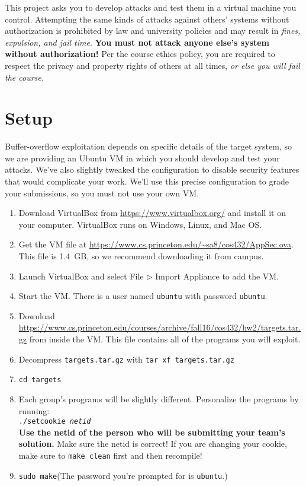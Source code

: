 \documentclass[letterpaper,12pt]{report}
\begin{document}
{This project asks you to develop attacks and test them in a virtual machine you
control.  Attempting the same kinds of attacks against others' systems without
authorization is prohibited by law and university policies and may result in
\emph{fines, expulsion, and jail time}.   \textbf{You must not attack anyone
else's system without authorization!}  Per the course ethics policy, you are
required to respect the privacy and  property rights of others at all times,
\emph{or else you will fail the course.}  

\section*{Setup}

Buffer-overflow exploitation depends on specific details of the target system,
so we are providing an Ubuntu VM in which you should develop and test your
attacks.  We've also slightly tweaked the configuration to disable security
features that would complicate your work.  We'll use this precise configuration
to grade your submissions, so you must not use your own VM.

\begin{enumerate}
\item Download VirtualBox from \url{https://www.virtualbox.org/} and install it on your computer.  VirtualBox runs on Windows, Linux, and Mac OS.
\item Get the VM file at
\url{https://www.cs.princeton.edu/~sa8/cos432/AppSec.ova}.
This file is 1.4~GB, so we recommend downloading it from campus.
\item Launch VirtualBox and select File $\rhd$ Import Appliance to add the VM.
\item Start the VM.  There is a user named \texttt{ubuntu} with password \texttt{ubuntu}.
\item Download
\url{https://www.cs.princeton.edu/courses/archive/fall16/cos432/hw2/targets.tar.gz} from inside
the VM.  This file contains all of the programs you will exploit.
\item Decompress \texttt{targets.tar.gz} with \texttt{tar xf targets.tar.gz}
\item \texttt{cd targets}
\item Each group's programs will be slightly different. Personalize the programs by running:\\
\texttt{./setcookie \emph{netid} }\\
{\bf Use the netid of the person who will be submitting your team's solution.}
Make sure the netid is correct! If you are changing your cookie, make sure to \texttt{make clean} first and then recompile!
\item \texttt{sudo make}\quad (The password you're prompted for is \texttt{ubuntu}.)



\end{enumerate}}
\end{document}
